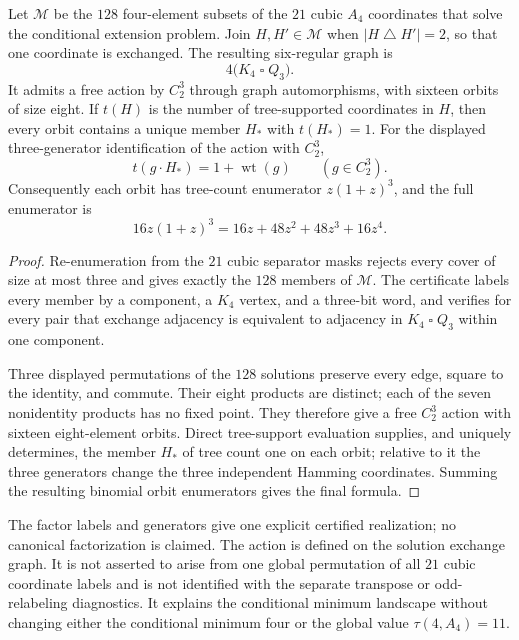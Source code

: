 \begin{proposition}
\label{prop:a4-exchange-cubes}
Let $\mathcal M$ be the $128$ four-element subsets of the $21$ cubic $A_4$
coordinates that solve the conditional extension problem.  Join
$H,H'\in\mathcal M$ when $|H\mathbin{\triangle}H'|=2$, so that one coordinate
is exchanged.  The resulting six-regular graph is
\[
  4\bigl(K_4\mathbin{\square}Q_3\bigr).
\]
It admits a free action by $C_2^3$ through graph automorphisms, with sixteen
orbits of size eight.  If $t(H)$ is the number of tree-supported coordinates
in $H$, then every orbit contains a unique member $H_*$ with $t(H_*)=1$.
For the displayed three-generator identification of the action with $C_2^3$,
\[
  t(g\mathbin{\cdot}H_*)=1+\operatorname{wt}(g)\qquad(g\in C_2^3).
\]
Consequently each orbit has tree-count enumerator $z(1+z)^3$, and the full
enumerator is
\[
  16z(1+z)^3=16z+48z^2+48z^3+16z^4.
\]
\end{proposition}

\begin{proof}
Re-enumeration from the $21$ cubic separator masks rejects every cover of
size at most three and gives exactly the $128$ members of $\mathcal M$.
The certificate labels every member by a component, a $K_4$ vertex, and a
three-bit word, and verifies for every pair that exchange adjacency is
equivalent to adjacency in $K_4\mathbin{\square}Q_3$ within one component.

Three displayed permutations of the $128$ solutions preserve every edge,
square to the identity, and commute.  Their eight products are distinct;
each of the seven nonidentity products has no fixed point.  They therefore
give a free $C_2^3$ action with sixteen eight-element orbits.  Direct
tree-support evaluation supplies, and uniquely determines, the member $H_*$
of tree count one on each orbit; relative to it the three generators change
the three independent Hamming coordinates.  Summing the resulting binomial
orbit enumerators gives the final formula.
\end{proof}

The factor labels and generators give one explicit certified realization;
no canonical factorization is claimed.  The action is defined on the
solution exchange graph.  It is not asserted to arise from one global
permutation of all $21$ cubic coordinate labels and is not identified with
the separate transpose or odd-relabeling diagnostics.  It explains the
conditional minimum landscape without changing either the conditional
minimum four or the global value $\tau(4,A_4)=11$.

